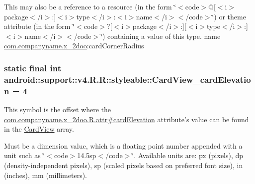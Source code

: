 This may also be a reference to a resource (in the form \char`\"{}$<$code$>$@\mbox{[}$<$i$>$package$<$/i$>$:\mbox{]}$<$i$>$type$<$/i$>$:$<$i$>$name$<$/i$>$$<$/code$>$\char`\"{}) or theme attribute (in the form \char`\"{}$<$code$>$?\mbox{[}$<$i$>$package$<$/i$>$:\mbox{]}\mbox{[}$<$i$>$type$<$/i$>$:\mbox{]}$<$i$>$name$<$/i$>$$<$/code$>$\char`\"{}) containing a value of this type.  name \hyperlink{namespacecom_1_1companyname_1_1x__2doo}{com.companyname.x\_\-2doo}:cardCornerRadius \hypertarget{classandroid_1_1support_1_1v4_1_1_r_1_1styleable_c0ff8cacb9a2d63dd25ab692b44a2804}{
\subsubsection[{CardView\_\-cardElevation}]{\setlength{\rightskip}{0pt plus 5cm}static final int android::support::v4.R.R::styleable::CardView\_\-cardElevation = 4}}
\label{classandroid_1_1support_1_1v4_1_1_r_1_1styleable_c0ff8cacb9a2d63dd25ab692b44a2804}


This symbol is the offset where the \hyperlink{classcom_1_1companyname_1_1x__2doo_1_1_r_1_1attr_e99520caecdbbdc4aa696c11d209cce9}{com.companyname.x\_\-2doo.R.attr\#cardElevation} attribute's value can be found in the \hyperlink{classandroid_1_1support_1_1v4_1_1_r_1_1styleable_4fcc6453aa91deadd7072add3aee5e56}{CardView} array.

Must be a dimension value, which is a floating point number appended with a unit such as \char`\"{}$<$code$>$14.5sp$<$/code$>$\char`\"{}. Available units are: px (pixels), dp (density-independent pixels), sp (scaled pixels based on preferred font size), in (inches), mm (millimeters). 

